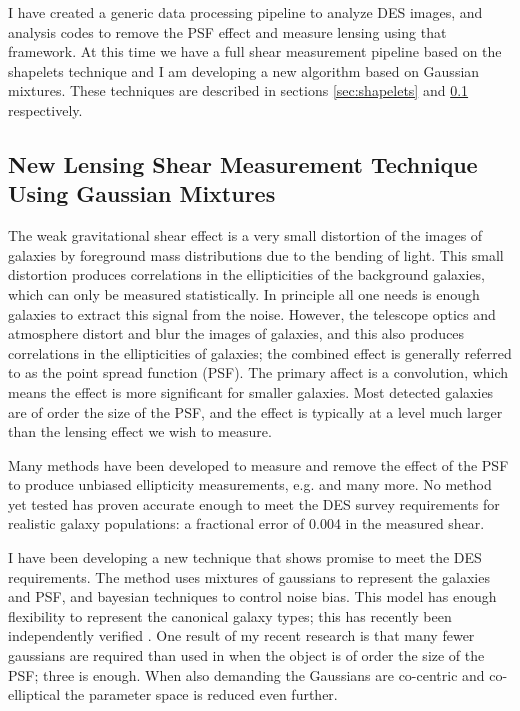 \documentclass[12pt]{article}
\begin{document}
I have created a generic data processing pipeline to analyze DES images, and
analysis codes to remove the PSF effect and measure lensing using that
framework.  At this time we have a full shear measurement pipeline based on the
shapelets technique and I am developing a new algorithm based on Gaussian
mixtures.  These techniques are described in sections \ref{sec:shapelets} and
\ref{sec:gmix} respectively.

\subsection{New Lensing Shear Measurement Technique Using Gaussian Mixtures}
\label{sec:gmix}

The weak gravitational shear effect is a very small distortion of the images of
galaxies by foreground mass distributions due to the bending of light.  This
small distortion produces correlations in the ellipticities of the background
galaxies, which can only be measured statistically.  In principle all one needs
is enough galaxies to extract this signal from the noise.  However, the
telescope optics and atmosphere distort and blur the images of galaxies, and
this also produces correlations in the ellipticities of galaxies; the combined
effect is generally referred to as the point spread function (PSF). The primary
affect is a convolution, which means the effect is more significant for smaller
galaxies.  Most detected galaxies are of order the size of the PSF, and the
effect is typically at a level much larger than the lensing effect we wish to
measure.

Many methods have been developed to measure and remove the effect of the PSF to
produce unbiased ellipticity measurements, e.g.
\cite{ksb95,Bern02,Miller07,Melchior11} and many more.  No method yet tested
has proven accurate enough to meet the DES survey requirements for realistic
galaxy populations:  a fractional error of 0.004 in the measured shear.

I have been developing a new technique that shows promise to meet the DES
requirements.  The method uses mixtures of gaussians to represent the galaxies
and PSF, and bayesian techniques to control noise bias.  This model has enough
flexibility to represent the canonical galaxy types; this has recently been
independently verified \citep{HoggGMix12}.  One result of my recent
research is that many fewer gaussians are required than used in
\cite{HoggGMix12} when the object is of order the size of the PSF; three is
enough.  When also demanding the Gaussians are co-centric and co-elliptical the
parameter space is reduced even further.  
\end{document}
